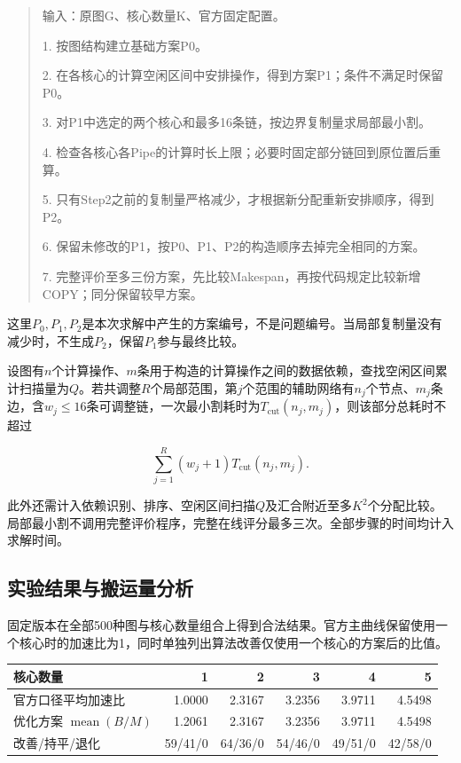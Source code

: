 \documentclass[anonymous,notoc]{gmcm2026}
\begin{document}
\begin{quote}
输入：原图G、核心数量K、官方固定配置。

1. 按图结构建立基础方案P0。

2. 在各核心的计算空闲区间中安排操作，得到方案P1；条件不满足时保留P0。

3. 对P1中选定的两个核心和最多16条链，按边界复制量求局部最小割。

4. 检查各核心各Pipe的计算时长上限；必要时固定部分链回到原位置后重算。

5. 只有Step2之前的复制量严格减少，才根据新分配重新安排顺序，得到P2。

6. 保留未修改的P1，按P0、P1、P2的构造顺序去掉完全相同的方案。

7. 完整评价至多三份方案，先比较Makespan，再按代码规定比较新增COPY；同分保留较早方案。
\end{quote}

这里\(P_0,P_1,P_2\)是本次求解中产生的方案编号，不是问题编号。当局部复制量没有减少时，不生成\(P_2\)，保留\(P_1\)参与最终比较。

设图有\(n\)个计算操作、\(m\)条用于构造的计算操作之间的数据依赖，查找空闲区间累计扫描量为\(Q\)。若共调整\(R\)个局部范围，第\(j\)个范围的辅助网络有\(n_j\)个节点、\(m_j\)条边，含\(w_j\le16\)条可调整链，一次最小割耗时为\(T_{\mathrm{cut}}(n_j,m_j)\)，则该部分总耗时不超过

\[\sum_{j=1}^{R}(w_j+1)T_{\mathrm{cut}}(n_j,m_j).\]

此外还需计入依赖识别、排序、空闲区间扫描\(Q\)及汇合附近至多\(K^2\)个分配比较。局部最小割不调用完整评价程序，完整在线评分最多三次。全部步骤的时间均计入求解时间。

\subsection{实验结果与搬运量分析}

固定版本在全部500种图与核心数量组合上得到合法结果。官方主曲线保留使用一个核心时的加速比为1，同时单独列出算法改善仅使用一个核心的方案后的比值。

\begin{table}[!htbp]\centering\small
\begin{tabularx}{\linewidth}{@{}Xrrrrr@{}}\toprule
核心数量 & 1 & 2 & 3 & 4 & 5 \\
\midrule
官方口径平均加速比 & 1.0000 & 2.3167 & 3.2356 & 3.9711 & 4.5498 \\
优化方案 $\operatorname{mean}(B/M)$ & 1.2061 & 2.3167 & 3.2356 & 3.9711 & 4.5498 \\
改善/持平/退化 & 59/41/0 & 64/36/0 & 54/46/0 & 49/51/0 & 42/58/0 \\
\bottomrule\end{tabularx}\end{table}
\end{document}
